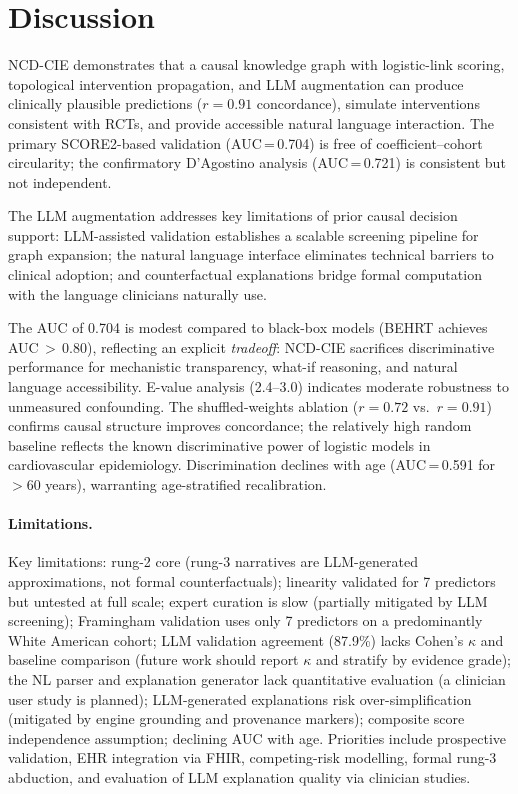 \documentclass[runningheads]{llncs}
\begin{document}
\section{Discussion}\label{sec:discussion}

NCD-CIE demonstrates that a causal knowledge graph with logistic-link
scoring, topological intervention propagation, and LLM augmentation
can produce clinically plausible predictions ($r = 0.91$ concordance),
simulate interventions consistent with RCTs, and provide accessible
natural language interaction.
The primary SCORE2-based validation (AUC\,=\,0.704) is free of
coefficient--cohort circularity; the confirmatory D'Agostino analysis
(AUC\,=\,0.721) is consistent but not independent.

The LLM augmentation addresses key limitations of prior causal
decision support: LLM-assisted validation establishes a scalable
screening pipeline for graph expansion; the natural language
interface eliminates technical barriers to clinical adoption; and
counterfactual explanations bridge formal computation with the
language clinicians naturally use.

The AUC of 0.704 is modest compared to black-box models
(BEHRT achieves AUC\,$>$\,0.80), reflecting an explicit
\emph{tradeoff}: NCD-CIE sacrifices discriminative performance for
mechanistic transparency, what-if reasoning, and natural language
accessibility.
E-value analysis (2.4--3.0) indicates moderate robustness to
unmeasured confounding.
The shuffled-weights ablation ($r = 0.72$ vs.\ $r = 0.91$)
confirms causal structure improves concordance; the relatively
high random baseline reflects the known discriminative power of
logistic models in cardiovascular epidemiology.
Discrimination declines with age (AUC\,=\,0.591 for $>$60 years),
warranting age-stratified recalibration.

\paragraph{Limitations.}
Key limitations: rung-2 core (rung-3 narratives are LLM-generated
approximations, not formal counterfactuals); linearity
validated for 7 predictors but untested at full scale; expert
curation is slow (partially mitigated by LLM screening);
Framingham validation uses only 7 predictors on a predominantly
White American cohort; LLM validation agreement (87.9\%) lacks Cohen's $\kappa$ and
baseline comparison (future work should report $\kappa$ and
stratify by evidence grade);
the NL parser and explanation generator lack quantitative
evaluation (a clinician user study is planned);
LLM-generated explanations risk over-simplification
(mitigated by engine grounding and provenance markers); composite score independence
assumption; declining AUC with age.
Priorities include prospective validation, EHR integration via
FHIR, competing-risk modelling, formal rung-3 abduction, and
evaluation of LLM explanation quality via clinician studies.
\end{document}
